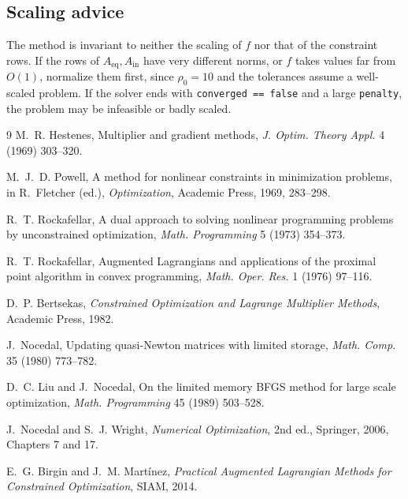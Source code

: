 \documentclass[11pt,a4paper]{article}
\newcommand{\Aeq}{A_{\mathrm{eq}}}
\newcommand{\Ain}{A_{\mathrm{in}}}
\begin{document}
\subsection{Scaling advice}
The method is invariant to neither the scaling of $f$ nor that of the
constraint rows. If the rows of $\Aeq,\Ain$ have very different norms, or $f$
takes values far from $O(1)$, normalize them first, since $\rho_0=10$ and
the tolerances assume a well-scaled problem. If the solver ends with
\texttt{converged == false} and a large \texttt{penalty}, the problem may be
infeasible or badly scaled.

\begin{thebibliography}{9}
M.~R. Hestenes, Multiplier and gradient methods,
\emph{J. Optim. Theory Appl.} 4 (1969) 303--320.

M.~J.~D. Powell, A method for nonlinear constraints in minimization problems,
in R.~Fletcher (ed.), \emph{Optimization}, Academic Press, 1969, 283--298.

R.~T. Rockafellar, A dual approach to solving nonlinear programming problems by
unconstrained optimization, \emph{Math. Programming} 5 (1973) 354--373.

R.~T. Rockafellar, Augmented Lagrangians and applications of the proximal point
algorithm in convex programming, \emph{Math. Oper. Res.} 1 (1976) 97--116.

D.~P. Bertsekas, \emph{Constrained Optimization and Lagrange Multiplier Methods},
Academic Press, 1982.

J.~Nocedal, Updating quasi-Newton matrices with limited storage,
\emph{Math. Comp.} 35 (1980) 773--782.

D.~C. Liu and J.~Nocedal, On the limited memory BFGS method for large scale
optimization, \emph{Math. Programming} 45 (1989) 503--528.

J.~Nocedal and S.~J. Wright, \emph{Numerical Optimization}, 2nd ed., Springer,
2006, Chapters 7 and 17.

E.~G. Birgin and J.~M. Mart\'inez, \emph{Practical Augmented Lagrangian Methods
for Constrained Optimization}, SIAM, 2014.
\end{thebibliography}
\end{document}
